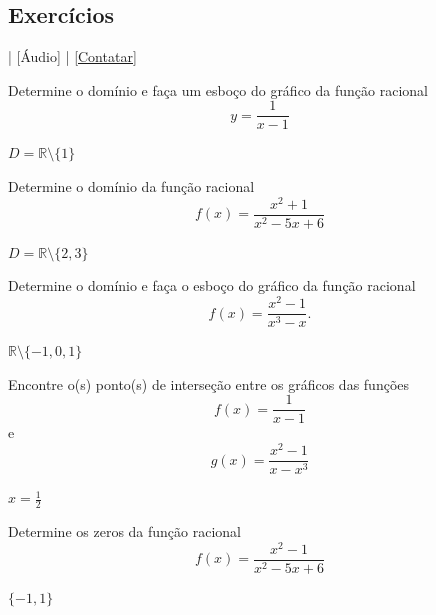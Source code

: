 \subsection*{Exercícios}

\begin{flushright}
  [Vídeo] | [Áudio] | \href{https://phkonzen.github.io/notas/contato.html}{[Contatar]}
\end{flushright}

\begin{exer}
  Determine o domínio e faça um esboço do gráfico da função racional
  \begin{equation}
    y = \frac{1}{x-1}
  \end{equation}
\end{exer}
\begin{resp}
  $D=\mathbb{R}\setminus\{1\}$
\end{resp}

\begin{exer}
  Determine o domínio da função racional
  \begin{equation}
    f(x) = \frac{x^2+1}{x^2-5x+6}
  \end{equation}
\end{exer}
\begin{resp}
  $D=\mathbb{R}\setminus\{2,3\}$
\end{resp}

\begin{exer}
  Determine o domínio e faça o esboço do gráfico da função racional
  \begin{equation}
    f(x) = \frac{x^2-1}{x^3-x}.
  \end{equation}
\end{exer}
\begin{resp}
  $\mathbb{R}\setminus\{-1,0,1\}$
\end{resp}

\begin{exer}
  Encontre o(s) ponto(s) de interseção entre os gráficos das funções
  \begin{equation}
    f(x) = \frac{1}{x-1}
  \end{equation}
  e
  \begin{equation}
    g(x) = \frac{x^2-1}{x-x^3}
  \end{equation}
\end{exer}
\begin{resp}
  $x=\frac{1}{2}$
\end{resp}

\begin{exer}
  Determine os zeros da função racional
  \begin{equation}
    f(x) = \frac{x^2-1}{x^2-5x+6}
  \end{equation}
\end{exer}
\begin{resp}
  $\{-1,1\}$
\end{resp}

